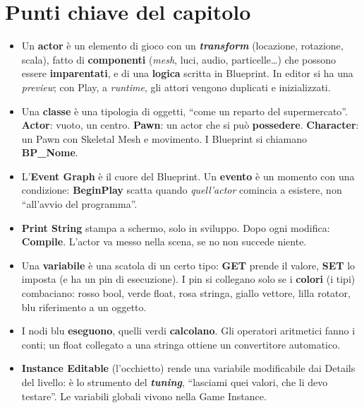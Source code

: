 \section*{Punti chiave del capitolo}

\begin{itemize}
  \item Un \textbf{actor} è un elemento di gioco con un \textbf{\emph{transform}}
        (locazione, rotazione, scala), fatto di \textbf{componenti} (\emph{mesh}, luci,
        audio, particelle\ldots) che possono essere \textbf{imparentati}, e di una
        \textbf{logica} scritta in Blueprint. In editor si ha una \emph{preview}; con
        Play, a \emph{runtime}, gli attori vengono duplicati e inizializzati.
  \item Una \textbf{classe} è una tipologia di oggetti, ``come un reparto del
        supermercato''. \textbf{Actor}: vuoto, un centro. \textbf{Pawn}: un actor che
        si può \textbf{possedere}. \textbf{Character}: un Pawn con Skeletal Mesh e
        movimento. I Blueprint si chiamano \textbf{BP\_Nome}.
  \item L'\textbf{Event Graph} è il cuore del Blueprint. Un \textbf{evento} è un
        momento con una condizione: \textbf{BeginPlay} scatta quando
        \emph{quell'actor} comincia a esistere, non ``all'avvio del programma''.
  \item \textbf{Print String} stampa a schermo, solo in sviluppo. Dopo ogni modifica:
        \textbf{Compile}. L'actor va messo nella scena, se no non succede niente.
  \item Una \textbf{variabile} è una scatola di un certo tipo: \textbf{GET} prende il
        valore, \textbf{SET} lo imposta (e ha un pin di esecuzione). I pin si collegano
        solo se i \textbf{colori} (i tipi) combaciano: rosso bool, verde float, rosa
        stringa, giallo vettore, lilla rotator, blu riferimento a un oggetto.
  \item I nodi blu \textbf{eseguono}, quelli verdi \textbf{calcolano}. Gli operatori
        aritmetici fanno i conti; un float collegato a una stringa ottiene un
        convertitore automatico.
  \item \textbf{Instance Editable} (l'occhietto) rende una variabile modificabile dai
        Details del livello: è lo strumento del \textbf{\emph{tuning}}, ``lasciami quei
        valori, che li devo testare''. Le variabili globali vivono nella Game Instance.

\end{itemize}
